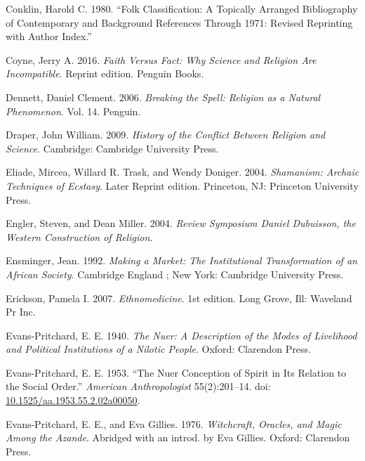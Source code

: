 \documentclass[
  11pt,
]{article}
\begin{document}
\leavevmode\hypertarget{ref-conklin1980folk}{}%
Conklin, Harold C. 1980. ``Folk Classification: A Topically Arranged Bibliography of Contemporary and Background References Through 1971: Revised Reprinting with Author Index.''

\leavevmode\hypertarget{ref-coyneFaithFactWhy2016}{}%
Coyne, Jerry A. 2016. \emph{Faith Versus Fact: Why Science and Religion Are Incompatible}. Reprint edition. Penguin Books.

\leavevmode\hypertarget{ref-dennett2006breaking}{}%
Dennett, Daniel Clement. 2006. \emph{Breaking the Spell: Religion as a Natural Phenomenon}. Vol. 14. Penguin.

\leavevmode\hypertarget{ref-draperHistoryConflictReligion2009}{}%
Draper, John William. 2009. \emph{History of the Conflict Between Religion and Science}. Cambridge: Cambridge University Press.

\leavevmode\hypertarget{ref-eliadeShamanismArchaicTechniques2004}{}%
Eliade, Mircea, Willard R. Trask, and Wendy Doniger. 2004. \emph{Shamanism: Archaic Techniques of Ecstasy}. Later Reprint edition. Princeton, NJ: Princeton University Press.

\leavevmode\hypertarget{ref-englerReviewSymposiumDaniel2004}{}%
Engler, Steven, and Dean Miller. 2004. \emph{Review Symposium Daniel Dubuisson, the Western Construction of Religion}.

\leavevmode\hypertarget{ref-ensmingerMakingMarketInstitutional1992}{}%
Ensminger, Jean. 1992. \emph{Making a Market: The Institutional Transformation of an African Society}. Cambridge England ; New York: Cambridge University Press.

\leavevmode\hypertarget{ref-ericksonEthnomedicine2007}{}%
Erickson, Pamela I. 2007. \emph{Ethnomedicine}. 1st edition. Long Grove, Ill: Waveland Pr Inc.

\leavevmode\hypertarget{ref-evans-pritchardNuerDescriptionModes1940}{}%
Evans-Pritchard, E. E. 1940. \emph{The Nuer: A Description of the Modes of Livelihood and Political Institutions of a Nilotic People}. Oxford: Clarendon Press.

\leavevmode\hypertarget{ref-evans-pritchardNuerConceptionSpirit1953}{}%
Evans-Pritchard, E. E. 1953. ``The Nuer Conception of Spirit in Its Relation to the Social Order.'' \emph{American Anthropologist} 55(2):201--14. doi: \href{https://doi.org/10.1525/aa.1953.55.2.02a00050}{10.1525/aa.1953.55.2.02a00050}.

\leavevmode\hypertarget{ref-evans-pritchardWitchcraftOraclesMagic1976}{}%
Evans-Pritchard, E. E., and Eva Gillies. 1976. \emph{Witchcraft, Oracles, and Magic Among the Azande}. Abridged with an introd. by Eva Gillies. Oxford: Clarendon Press.
\end{document}
